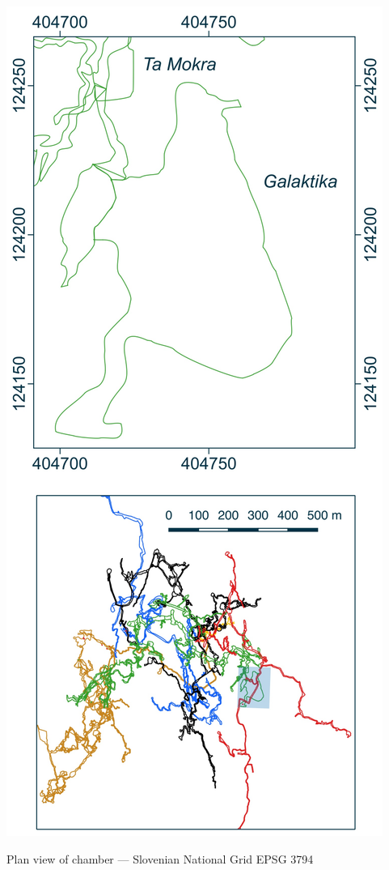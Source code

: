 \begin{marginsurvey}
\vspace{-400pt}
\includegraphics[width=\linewidth]{images/little_insets/galaktika_inset.pdf}
\label{Ta Mokra}
\caption[Galaktika chamber]{ Plan view of    \protect{} chamber --- Slovenian National Grid EPSG 3794}
\end{marginsurvey}

